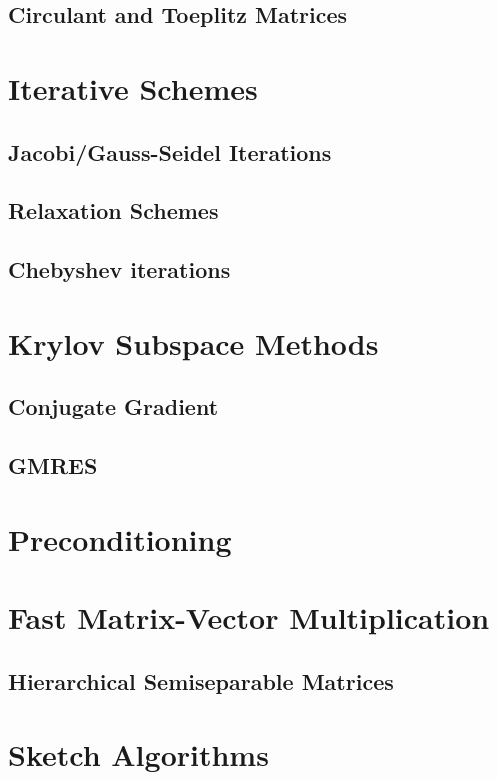 \subsection{Circulant and Toeplitz Matrices}

\section{Iterative Schemes}
\subsection{Jacobi/Gauss-Seidel Iterations}
\subsection{Relaxation Schemes}
\subsection{Chebyshev iterations}
\newpage
\section{Krylov Subspace Methods}
\subsection{Conjugate Gradient}
\subsection{GMRES}

\section{Preconditioning}

\section{Fast Matrix-Vector Multiplication}
\subsection{Hierarchical Semiseparable Matrices}


\section{Sketch Algorithms}


% 
\nocite{}



